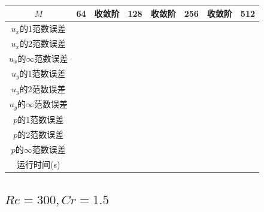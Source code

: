 \documentclass[lang=cn,10pt,bibend=bibtex]{elegantbook}
\begin{document}
\begin{table}[H]
  \centering
  \small
  \begin{tabular}{c|ccccccc}
  \textbf{$M$}              & 64          & 收敛阶 & 128         & 收敛阶 & 256         & 收敛阶 & 512   \\ \hline
  $u_x$的1范数误差                  &  &   &  &   &  &   &  \\
  $u_x$的2范数误差                  &  &   &  &   &  &   &  \\
  $u_x$的$\infty$范数误差           &  &   &  &   &  &   &  \\
  $u_y$的1范数误差                  &  &   &  &   &  &   &  \\
  $u_y$的2范数误差                  &  &   &  &   &  &   &  \\
  $u_y$的$\infty$范数误差           &  &   &  &   &  &   &  \\
  $p$的1范数误差                  &  &   &  &   &  &   &  \\
  $p$的2范数误差                  &  &   &  &   &  &   &  \\
  $p$的$\infty$范数误差           &  &   &  &   &  &   &  \\
  运行时间(s)                &            &       &           &       &          &       & 
  \end{tabular}
\end{table}

\subsection{$Re=300,Cr=1.5$}
\end{document}
